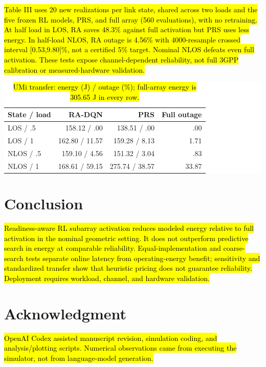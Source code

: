 \documentclass[letterpaper,conference]{IEEEtran}
\newcommand{\rev}[1]{\hl{#1}}
\newcommand{\revbox}[1]{\colorbox{white}{#1}}
\newcommand{\rev}[1]{\hl{#1}}
\newcommand{\revbox}[1]{\colorbox{yellow}{#1}}
\begin{document}
\rev{Table III uses 20 new realizations per link state, shared across two loads and the five frozen RL models, PRS, and full array (560 evaluations), with no retraining. At half load in LOS, RA saves 48.3\% against full activation but PRS uses less energy. In half-load NLOS, RA outage is 4.56\% with 4000-resample crossed interval [0.53,9.80]\%, not a certified 5\% target. Nominal NLOS defeats even full activation. These tests expose channel-dependent reliability, not full 3GPP calibration or measured-hardware validation.}
\begin{table}[!t]
\caption{\rev{UMi transfer: energy (J) / outage (\%); full-array energy is 305.65 J in every row.}}
\label{tab:standard}
\centering\footnotesize
\setlength{\tabcolsep}{3pt}
\revbox{\begin{tabular}{@{}lrrr@{}}
\toprule
State / load & RA-DQN & PRS & Full outage\\
\midrule
LOS / .5 & 158.12 / .00 & 138.51 / .00 & .00\\
LOS / 1 & 162.80 / 11.57 & 159.28 / 8.13 & 1.71\\
NLOS / .5 & 159.10 / 4.56 & 151.32 / 3.04 & .83\\
NLOS / 1 & 168.61 / 59.15 & 275.74 / 38.57 & 33.87\\
\bottomrule
\end{tabular}}
\end{table}

\section{Conclusion}
\rev{Readiness-aware RL subarray activation reduces modeled energy relative to full activation in the nominal geometric setting. It does not outperform predictive search in energy at comparable reliability. Equal-implementation and coarse-search tests separate online latency from operating-energy benefit; sensitivity and standardized transfer show that heuristic pricing does not guarantee reliability. Deployment requires workload, channel, and hardware validation.}

\newpage
\section*{Acknowledgment}
\rev{OpenAI Codex assisted manuscript revision, simulation coding, and analysis/plotting scripts. Numerical observations came from executing the simulator, not from language-model generation.}


\end{document}
